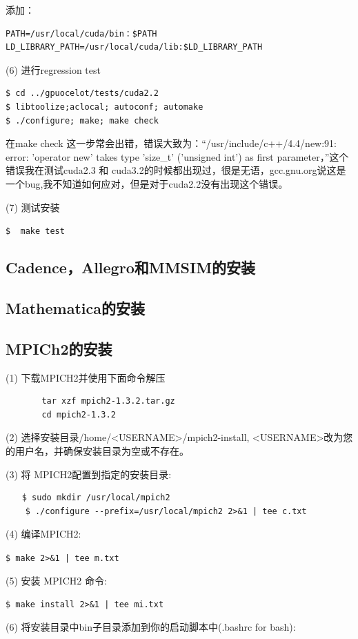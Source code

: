 添加：
\begin{verbatim}
PATH=/usr/local/cuda/bin：$PATH
LD_LIBRARY_PATH=/usr/local/cuda/lib:$LD_LIBRARY_PATH
\end{verbatim}

(6) 进行regression test
\begin{verbatim}
$ cd ../gpuocelot/tests/cuda2.2
$ libtoolize;aclocal; autoconf; automake
$ ./configure; make; make check
\end{verbatim}

在make check 这一步常会出错，错误大致为：“/usr/include/c++/4.4/new:91: error: 'operator new' takes type 'size\_t' ('unsigned int') as first parameter，”这个错误我在测试cuda2.3 和 cuda3.2的时候都出现过，很是无语，gcc.gnu.org说这是一个bug,我不知道如何应对，但是对于cuda2.2没有出现这个错误。

(7) 测试安装

\verb"$  make test"

\subsection{Cadence，Allegro和MMSIM的安装}

\subsection{Mathematica的安装}

\subsection{MPICh2的安装}
(1) 下载MPICH2并使用下面命令解压
\begin{verbatim}
　　    tar xzf mpich2-1.3.2.tar.gz
　　    cd mpich2-1.3.2
\end{verbatim}

(2) 选择安装目录/home/<USERNAME>/mpich2-install, <USERNAME>改为您的用户名，并确保安装目录为空或不存在。

(3) 将 MPICH2配置到指定的安装目录:
\begin{verbatim}
　　$ sudo mkdir /usr/local/mpich2
    $ ./configure --prefix=/usr/local/mpich2 2>&1 | tee c.txt
\end{verbatim}

(4) 编译MPICH2:

\verb"$ make 2>&1 | tee m.txt"

(5) 安装 MPICH2 命令:

\verb"$ make install 2>&1 | tee mi.txt"

(6) 将安装目录中bin子目录添加到你的启动脚本中(.bashrc for bash):

